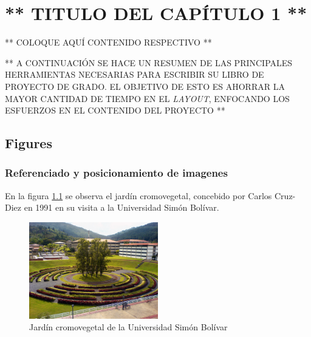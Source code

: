 \chapter{** TITULO DEL CAPÍTULO 1 **}
\thispagestyle{empty}

\abovedisplayskip=0pt
\belowdisplayskip=10pt
\abovedisplayshortskip=0pt
\belowdisplayshortskip=10pt

** COLOQUE AQUÍ CONTENIDO RESPECTIVO **

** A CONTINUACIÓN SE HACE UN RESUMEN DE LAS PRINCIPALES HERRAMIENTAS NECESARIAS PARA ESCRIBIR SU LIBRO DE PROYECTO DE GRADO. EL OBJETIVO DE ESTO ES AHORRAR LA MAYOR CANTIDAD DE TIEMPO EN EL \textit{LAYOUT}, ENFOCANDO LOS ESFUERZOS EN EL CONTENIDO DEL PROYECTO **

\section{Figures}

\subsection{Referenciado y posicionamiento de imagenes}

En la figura \ref{fig:cromovegetal} se observa el jardín cromovegetal, concebido por Carlos Cruz-Diez en 1991 en su visita a la Universidad Simón Bolívar.


\begin{figure}[H]
\centering
\includegraphics[width=0.50\textwidth]{2_MainMatter/Capitulo1/Imagenes/cromovegetal.jpg}
\caption{Jardín cromovegetal de la Universidad Simón Bolívar}
\label{fig:cromovegetal}
\end{figure}

